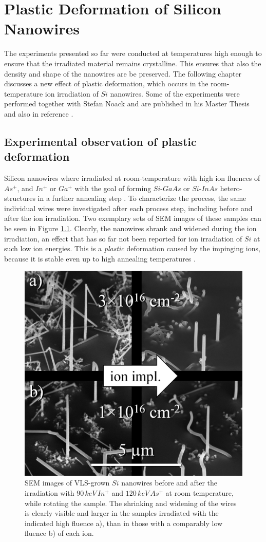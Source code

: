 \chapter{Plastic Deformation of Silicon Nanowires}
\label{sec:plastic}

The experiments presented so far were conducted at temperatures high enough to ensure that the irradiated material remains crystalline. This ensures that also the density and shape of the nanowires are be preserved. The following chapter discusses a new effect of plastic deformation, which occurs in the room-temperature ion irradiation of $Si$ nanowires. Some of the experiments were performed together with Stefan Noack and are published in his Master Thesis \cite{noack_sputter_2014} and also in reference \cite{johannes_anomalous_2015}.

\section{Experimental observation of plastic deformation}
\label{sec:expdeformation}

Silicon nanowires where irradiated at room-temperature with high ion fluences of $As^+$, and $In^+$ or $Ga^+$ with the goal of forming $Si$-$GaAs$ or $Si$-$InAs$ hetero-structures in a further annealing step \cite{prucnal_iii-v_2014,glaser_personal_2015}. To characterize the process, the same individual wires were investigated after each process step, including before and after the ion irradiation. Two exemplary sets of SEM images of these samples can be seen in Figure \ref{deformSEM}. Clearly, the nanowires shrank and widened during the ion irradiation, an effect that has so far not been reported for ion irradiation of $Si$ at such low ion energies. This is a \emph{plastic} deformation caused by the impinging ions, because it is stable even up to high annealing temperatures \cite{prucnal_iii-v_2014,glaser_personal_2015}.

\begin{figure}
	\centering
		\includegraphics[width=.45\textwidth]{images/deformSEM.png}
	\caption{SEM images of VLS-grown $Si$ nanowires before and after the irradiation with $90\,keV\, In^+$ and $120\,keV\,As^+$ at room temperature, while rotating the sample. The shrinking and widening of the wires is clearly visible and larger in the samples irradiated with the indicated high fluence a), than in those with a comparably low fluence b) of each ion.} 
	\label{deformSEM}
\end{figure}


